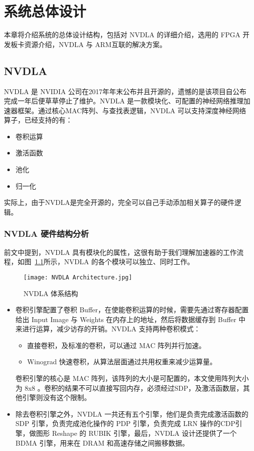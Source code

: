 \chapter{系统总体设计}\label{chap:systemoveral}

本章将介绍系统的总体设计结构，包括对 NVDLA 的详细介绍，选用的 FPGA 开发板卡资源介绍，NVDLA 与 ARM互联的解决方案。

\section{NVDLA}

NVDLA 是 NVIDIA 公司在2017年年末公布并且开源的，遗憾的是该项目自公布完成一年后便草草停止了维护。NVDLA 是一款模块化、可配置的神经网络推理加速器框架。通过核心MAC阵列、与查找表逻辑，NVDLA 可以支持深度神经网络算子，已经支持的有：

\begin{itemize}
    \item 卷积运算
    \item 激活函数
    \item 池化
    \item 归一化
\end{itemize}

实际上，由于NVDLA是完全开源的，完全可以自己手动添加相关算子的硬件逻辑。

\subsection{NVDLA 硬件结构分析}

前文中提到，NVDLA 具有模块化的属性，这很有助于我们理解加速器的工作流程，如图~\ref{fig:NVDLA Architecture}所示，NVDLA 的各个模块可以独立、同时工作。

\begin{figure}[!htbp]
    \centering
    \texttt{[image: NVDLA Architecture.jpg]}
    \caption{NVDLA 体系结构}
    \label{fig:NVDLA Architecture}
\end{figure}

\begin{itemize}
    \item 卷积引擎配置了卷积 Buffer，在使能卷积运算的时候，需要先通过寄存器配置给出 Input Image 与 Weights 在内存上的地址，然后将数据缓存到 Buffer 中来进行运算，减少访存的开销。NVDLA 支持两种卷积模式：
    \begin{itemize}
        \item 直接卷积，及标准的卷积，可以通过 MAC 阵列并行加速。
        \item Winograd 快速卷积，从算法层面通过共用权重来减少运算量。
    \end{itemize}
    卷积引擎的核心是 MAC 阵列，该阵列的大小是可配置的，本文使用阵列大小为 8x8 。卷积的结果不可以直接写回内存，必须经过SDP，及激活函数层，其他引擎则没有这个限制。
    \item 除去卷积引擎之外，NVDLA 一共还有五个引擎，他们是负责完成激活函数的 SDP 引擎，负责完成池化操作的 PDP 引擎，负责完成 LRN 操作的CDP引擎，做图形 Reshape 的 RUBIK 引擎，最后，NVDLA 设计还提供了一个 BDMA 引擎，用来在 DRAM 和高速存储之间搬移数据。
\end{itemize}

